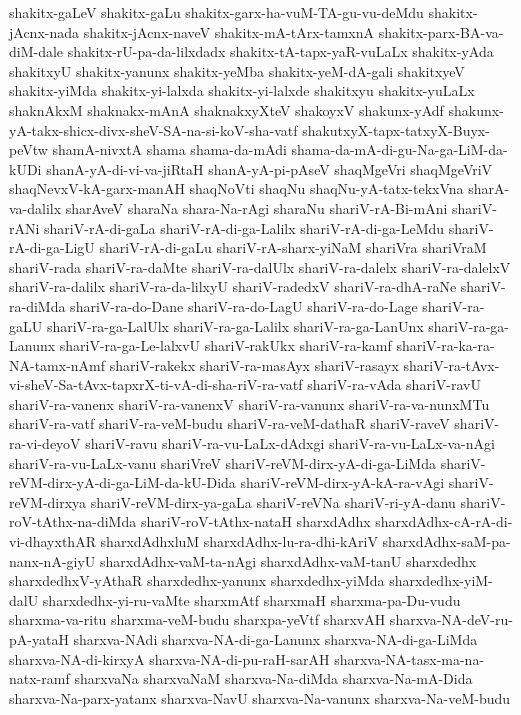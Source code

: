 {shakitx-gaLeV
shakitx-gaLu
shakitx-garx-ha-vuM-TA-gu-vu-deMdu
shakitx-jAcnx-nada
shakitx-jAcnx-naveV
shakitx-mA-tArx-tamxnA
shakitx-parx-BA-va-diM-dale
shakitx-rU-pa-da-lilxdadx
shakitx-tA-tapx-yaR-vuLaLx
shakitx-yAda
shakitxyU
shakitx-yanunx
shakitx-yeMba
shakitx-yeM-dA-gali
shakitxyeV
shakitx-yiMda
shakitx-yi-lalxda
shakitx-yi-lalxde
shakitxyu
shakitx-yuLaLx
shaknAkxM
shaknakx-mAnA
shaknakxyXteV
shakoyxV
shakunx-yAdf
shakunx-yA-takx-shicx-divx-sheV-SA-na-si-koV-sha-vatf
shakutxyX-tapx-tatxyX-Buyx-peVtw
shamA-nivxtA
shama
shama-da-mAdi
shama-da-mA-di-gu-Na-ga-LiM-da-kUDi
shanA-yA-di-vi-va-jiRtaH
shanA-yA-pi-pAseV
shaqMgeVri
shaqMgeVriV
shaqNevxV-kA-garx-manAH
shaqNoVti
shaqNu
shaqNu-yA-tatx-tekxVna
sharA-va-dalilx
sharAveV
sharaNa
shara-Na-rAgi
sharaNu
shariV-rA-Bi-mAni
shariV-rANi
shariV-rA-di-gaLa
shariV-rA-di-ga-Lalilx
shariV-rA-di-ga-LeMdu
shariV-rA-di-ga-LigU
shariV-rA-di-gaLu
shariV-rA-sharx-yiNaM
shariVra
shariVraM
shariV-rada
shariV-ra-daMte
shariV-ra-dalUlx
shariV-ra-dalelx
shariV-ra-dalelxV
shariV-ra-dalilx
shariV-ra-da-lilxyU
shariV-radedxV
shariV-ra-dhA-raNe
shariV-ra-diMda
shariV-ra-do-Dane
shariV-ra-do-LagU
shariV-ra-do-Lage
shariV-ra-gaLU
shariV-ra-ga-LalUlx
shariV-ra-ga-Lalilx
shariV-ra-ga-LanUnx
shariV-ra-ga-Lanunx
shariV-ra-ga-Le-lalxvU
shariV-rakUkx
shariV-ra-kamf
shariV-ra-ka-ra-NA-tamx-nAmf
shariV-rakekx
shariV-ra-masAyx
shariV-rasayx
shariV-ra-tAvx-vi-sheV-Sa-tAvx-tapxrX-ti-vA-di-sha-riV-ra-vatf
shariV-ra-vAda
shariV-ravU
shariV-ra-vanenx
shariV-ra-vanenxV
shariV-ra-vanunx
shariV-ra-va-nunxMTu
shariV-ra-vatf
shariV-ra-veM-budu
shariV-ra-veM-dathaR
shariV-raveV
shariV-ra-vi-deyoV
shariV-ravu
shariV-ra-vu-LaLx-dAdxgi
shariV-ra-vu-LaLx-va-nAgi
shariV-ra-vu-LaLx-vanu
shariVreV
shariV-reVM-dirx-yA-di-ga-LiMda
shariV-reVM-dirx-yA-di-ga-LiM-da-kU-Dida
shariV-reVM-dirx-yA-kA-ra-vAgi
shariV-reVM-dirxya
shariV-reVM-dirx-ya-gaLa
shariV-reVNa
shariV-ri-yA-danu
shariV-roV-tAthx-na-diMda
shariV-roV-tAthx-nataH
sharxdAdhx
sharxdAdhx-cA-rA-di-vi-dhayxthAR
sharxdAdhxluM
sharxdAdhx-lu-ra-dhi-kAriV
sharxdAdhx-saM-pa-nanx-nA-giyU
sharxdAdhx-vaM-ta-nAgi
sharxdAdhx-vaM-tanU
sharxdedhx
sharxdedhxV-yAthaR
sharxdedhx-yanunx
sharxdedhx-yiMda
sharxdedhx-yiM-dalU
sharxdedhx-yi-ru-vaMte
sharxmAtf
sharxmaH
sharxma-pa-Du-vudu
sharxma-va-ritu
sharxma-veM-budu
sharxpa-yeVtf
sharxvAH
sharxva-NA-deV-ru-pA-yataH
sharxva-NAdi
sharxva-NA-di-ga-Lanunx
sharxva-NA-di-ga-LiMda
sharxva-NA-di-kirxyA
sharxva-NA-di-pu-raH-sarAH
sharxva-NA-tasx-ma-na-natx-ramf
sharxvaNa
sharxvaNaM
sharxva-Na-diMda
sharxva-Na-mA-Dida
sharxva-Na-parx-yatanx
sharxva-NavU
sharxva-Na-vanunx
sharxva-Na-veM-budu
}
